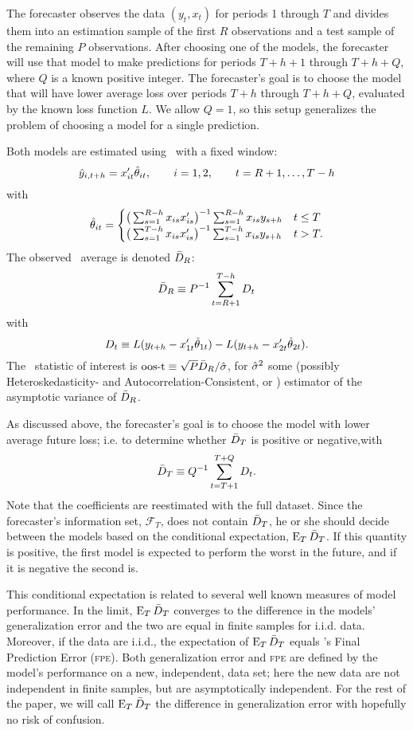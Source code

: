 \documentclass[11pt]{article}
\newcommand{\citepos}[1]{\citeauthor{#1}'s \citeyearpar{#1}}
\begin{document}
The forecaster observes the data $(y_t,x_t)$ for periods 1 through $T$
and divides them into an estimation sample of the first $R$
observations and a test sample of the remaining $P$ observations.
After choosing one of the models, the forecaster will use that model
to make predictions for periods $T + h + 1$ through $T + h + Q$, where
$Q$ is a known positive integer.  The forecaster's goal is to choose
the model that will have lower average loss over periods $T+h$ through
$T+h+Q$, evaluated by the known loss function $L$.  We allow $Q = 1$,
so this setup generalizes the problem of choosing a model for a single
prediction.

Both models are estimated using \ols\ with a fixed window:
\[
\hat y_{i,t+h} = x_{it}'\hat{\theta}_{it}, \qquad i=1,2, \qquad t
= R+1,\dots,T-h
\]
with
\begin{equation*}
  \hat\theta_{it} =
  \begin{cases}
    \big(\sum_{s=1}^{R-h} x_{is}x_{is}'\big)^{-1} \sum_{s=1}^{R-h}
    x_{is} y_{s+h} & t \leq T \\
    \big(\sum_{s=1}^{T-h} x_{is}x_{is}'\big)^{-1}
    \sum_{s=1}^{T-h} x_{is} y_{s+h} & t > T.
  \end{cases}
\end{equation*}
The observed \oos\ average is denoted $\bar{D}_{R}$: \[\bar{D}_{R} \equiv P^{-1}
\sum_{t=R+1}^{T-h} D_t\]  with
\[
D_t \equiv L(y_{t+h} - x_{1t}'\hat\theta_{1t}) - L(y_{t+h} - x_{2t}'\hat\theta_{2t}).
\]
The \oos\ statistic of interest is $\operatorname{oos-t} \equiv \sqrt{P} \bar{D}_{R} /
\hat{\sigma}$, for $\hat{\sigma}^2$ some (possibly Heteroskedasticity- and
Autocorrelation-Consistent, or \hac) estimator of the asymptotic
variance of $\bar{D}_{R}$.

As discussed above, the forecaster's goal is to choose the model with
lower average future loss; i.e. to determine whether $\bar{D}_{T}$ is
positive or negative,with
\[
\bar{D}_{T} \equiv Q^{-1} \sum_{t=T+1}^{T+Q} D_t.
\]
Note that the coefficients are reestimated with the full dataset.
Since the forecaster's information set, $\mathcal{F}_T$, does not
contain $\bar{D}_{T}$, he or she should decide between the models based on
the conditional expectation, $\operatorname{E}_T \bar{D}_{T}$. If this quantity is
positive, the first model is expected to perform the worst in the
future, and if it is negative the second is.

This conditional expectation is related to several well known measures
of model performance.  In the limit, $\operatorname{E}_{T} \bar{D}_{T}$ converges to
the difference in the models' generalization error and the two are
equal in finite samples for i.i.d. data.  Moreover, if the data are
i.i.d., the expectation of $\operatorname{E}_T \bar{D}_{T}$ equals \citepos{Aka:69} Final
Prediction Error (\textsc{fpe}).  Both generalization error and
\textsc{fpe} are defined by the model's performance on a new,
independent, data set; here the new data are not independent in finite
samples, but are asymptotically independent.  For the rest of the
paper, we will call $\operatorname{E}_T \bar{D}_{T}$ the difference in generalization
error with hopefully no risk of confusion.
\end{document}
